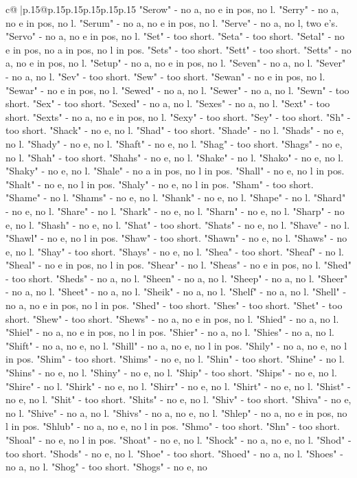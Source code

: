 \documentclass{article}
\begin{document}
{\begin{supertabular}{c@{$\;$}|p{.15\linewidth}@{}p{.15\linewidth}p{.15\linewidth}p{.15\linewidth}p{.15\linewidth}p{.15\linewidth}}
{{{"Serow" {-} no a, no e in pos, no l. "Serry" {-} no a, no e in pos, no l. "Serum" {-} no a, no e in pos, no l. "Serve" {-} no a, no l, two e's. "Servo" {-} no a, no e in pos, no l. "Set" {-} too short. "Seta" {-} too short. "Setal" {-} no e in pos, no a in pos, no l in pos. "Sets" {-} too short. "Sett" {-} too short. "Setts" {-} no a, no e in pos, no l. "Setup" {-} no a, no e in pos, no l. "Seven" {-} no a, no l. "Sever" {-} no a, no l. "Sev" {-} too short. "Sew" {-} too short. "Sewan" {-} no e in pos, no l. "Sewar" {-} no e in pos, no l. "Sewed" {-} no a, no l. "Sewer" {-} no a, no l. "Sewn" {-} too short. "Sex" {-} too short. "Sexed" {-} no a, no l. "Sexes" {-} no a, no l. "Sext" {-} too short. "Sexts" {-} no a, no e in pos, no l. "Sexy" {-} too short. "Sey" {-} too short. "Sh" {-} too short. "Shack" {-} no e, no l. "Shad" {-} too short. "Shade" {-} no l. "Shads" {-} no e, no l. "Shady" {-} no e, no l. "Shaft" {-} no e, no l. "Shag" {-} too short. "Shags" {-} no e, no l. "Shah" {-} too short. "Shahs" {-} no e, no l. "Shake" {-} no l. "Shako" {-} no e, no l. "Shaky" {-} no e, no l. "Shale" {-} no a in pos, no l in pos. "Shall" {-} no e, no l in pos. "Shalt" {-} no e, no l in pos. "Shaly" {-} no e, no l in pos. "Sham" {-} too short. "Shame" {-} no l. "Shams" {-} no e, no l. "Shank" {-} no e, no l. "Shape" {-} no l. "Shard" {-} no e, no l. "Share" {-} no l. "Shark" {-} no e, no l. "Sharn" {-} no e, no l. "Sharp" {-} no e, no l. "Shash" {-} no e, no l. "Shat" {-} too short. "Shats" {-} no e, no l. "Shave" {-} no l. "Shawl" {-} no e, no l in pos. "Shaw" {-} too short. "Shawn" {-} no e, no l. "Shaws" {-} no e, no l. "Shay" {-} too short. "Shays" {-} no e, no l. "Shea" {-} too short. "Sheaf" {-} no l. "Sheal" {-} no e in pos, no l in pos. "Shear" {-} no l. "Sheas" {-} no e in pos, no l. "Shed" {-} too short. "Sheds" {-} no a, no l. "Sheen" {-} no a, no l. "Sheep" {-} no a, no l. "Sheer" {-} no a, no l. "Sheet" {-} no a, no l. "Sheik" {-} no a, no l. "Shelf" {-} no a, no l. "Shell" {-} no a, no e in pos, no l in pos. "Shed" {-} too short. "Shes" {-} too short. "Shet" {-} too short. "Shew" {-} too short. "Shews" {-} no a, no e in pos, no l. "Shied" {-} no a, no l. "Shiel" {-} no a, no e in pos, no l in pos. "Shier" {-} no a, no l. "Shies" {-} no a, no l. "Shift" {-} no a, no e, no l. "Shill" {-} no a, no e, no l in pos. "Shily" {-} no a, no e, no l in pos. "Shim" {-} too short. "Shims" {-} no e, no l. "Shin" {-} too short. "Shine" {-} no l. "Shins" {-} no e, no l. "Shiny" {-} no e, no l. "Ship" {-} too short. "Ships" {-} no e, no l. "Shire" {-} no l. "Shirk" {-} no e, no l. "Shirr" {-} no e, no l. "Shirt" {-} no e, no l. "Shist" {-} no e, no l. "Shit" {-} too short. "Shits" {-} no e, no l. "Shiv" {-} too short. "Shiva" {-} no e, no l. "Shive" {-} no a, no l. "Shivs" {-} no a, no e, no l. "Shlep" {-} no a, no e in pos, no l in pos. "Shlub" {-} no a, no e, no l in pos. "Shmo" {-} too short. "Shn" {-} too short. "Shoal" {-} no e, no l in pos. "Shoat" {-} no e, no l. "Shock" {-} no a, no e, no l. "Shod" {-} too short. "Shods" {-} no e, no l. "Shoe" {-} too short. "Shoed" {-} no a, no l. "Shoes" {-} no a, no l. "Shog" {-} too short. "Shogs" {-} no e, no }}}
\end{supertabular}}
\end{document}

